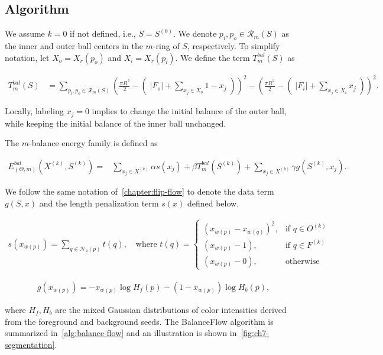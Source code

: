 \subsection{Algorithm}

We assume $k=0$ if not defined, i.e., $S=S^{(0)}$. We denote $p_i, p_o \in \mathcal{R}_m(S)$ as the inner and outer ball centers in the $m$-ring of $S$, respectively. To simplify notation, let $X_o=X_r(p_o)$ and $X_i=X_r(p_i)$. We define the term $T_{m}^{bal}(S)$ as

\begin{align}
	T_{m}^{bal}(S) &= \sum_{p_i,p_o \in \mathcal{R}_m(S)}{( \frac{\pi R^2}{2} - (\; |F_o| + \sum_{ x_j \in X_o}{1-x_j} \; ) )^2 -(\frac{\pi R^2}{2} - (\; |F_i| + \sum_{x_j \in X_i}{x_j}\;))^2}.
	\label{eq:balance-term}
\end{align}

Locally, labeling $x_j=0$ implies to change the initial balance of the outer ball, while keeping the initial balance of the inner ball unchanged. 

The $m$-balance energy family is defined as

\begin{align}
  E_{(\Theta,m)}^{bal}(X^{(k)},S^{(k)}) =& \sum_{x_j \in X^{(k)}}{\alpha s(x_j)} + \beta T_{m}^{bal}(S^{(k)}) + \sum_{x_j \in X^{(k)}}{\gamma g(S^{(k)},x_j)}.
  \label{eq:single-step-energy-family}
\end{align}

We follow the same notation of~\cref{chapter:flip-flow} to denote the data term $g(S,x)$ and the length penalization term $s(x)$ defined below. 

\begin{align}
  s(x_{w(p)})=\sum_{q \in \mathcal{N}_4(p)}{ t(q) }, \quad \text{where } t(q) = \left\{\begin{array}{ll}
  (x_{w(p)}-x_{w(q)})^2, & \text{if } q \in O^{(k)}\\
  (x_{w(p)}-1), & \text{if } q \in F^{(k)}\\
  (x_{w(p)}-0), & \text{otherwise }
  \end{array}\right.
  \label{eq:single-step-length-penalization}
\end{align}

\begin{align}
  g(x_{w(p)}) = -x_{w(p)}\log{H_f(p)} - (1-x_{w(p)})\log{H_b(p)},
  \label{eq:single-step-data-fidelity}
\end{align}	

where $H_f ,H_b $ are the mixed Gaussian distributions of color intensities derived from the foreground and background seeds. The BalanceFlow algorithm is summarized in~\cref{alg:balance-flow} and an illustration is shown in~\cref{fig:ch7-segmentation}.

